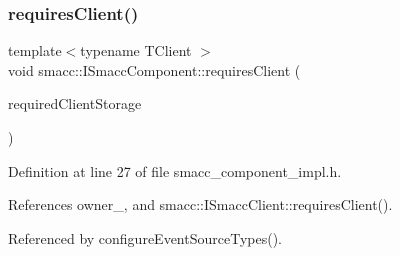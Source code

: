\mbox{\label{classsmacc_1_1ISmaccComponent_a36c085d906fbae0fcaee817aaeafebf4}} 
\subsubsection{\texorpdfstring{requires\+Client()}{requiresClient()}}
{\footnotesize\ttfamily template$<$typename T\+Client $>$ \\
void smacc\+::\+I\+Smacc\+Component\+::requires\+Client (\begin{DoxyParamCaption}\item[{\hyperlink{classTClient}{T\+Client} $\ast$\&}]{required\+Client\+Storage }\end{DoxyParamCaption})\hspace{0.3cm}{\ttfamily [protected]}}



Definition at line 27 of file smacc\+\_\+component\+\_\+impl.\+h.



References owner\+\_\+, and smacc\+::\+I\+Smacc\+Client\+::requires\+Client().



Referenced by configure\+Event\+Source\+Types().


